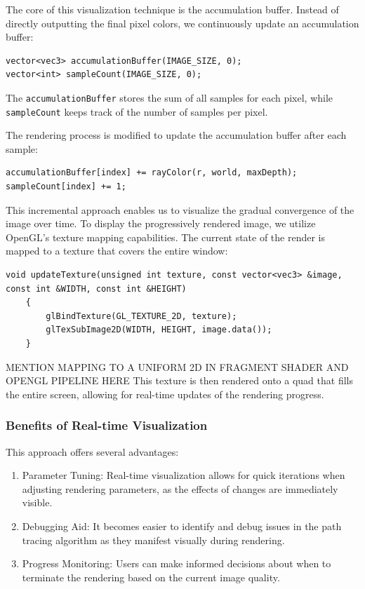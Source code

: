 \documentclass[12pt]{article}
\begin{document}
The core of this visualization technique is the accumulation buffer. Instead of directly outputting the final pixel colors, we continuously update an accumulation buffer:

\begin{verbatim}
vector<vec3> accumulationBuffer(IMAGE_SIZE, 0);
vector<int> sampleCount(IMAGE_SIZE, 0);
\end{verbatim}

The \texttt{accumulationBuffer} stores the sum of all samples for each pixel, while \texttt{sampleCount} keeps track of the number of samples per pixel.

The rendering process is modified to update the accumulation buffer after each sample:

\begin{verbatim}
accumulationBuffer[index] += rayColor(r, world, maxDepth);
sampleCount[index] += 1;
\end{verbatim}

This incremental approach enables us to visualize the gradual convergence of the image over time.
To display the progressively rendered image, we utilize OpenGL's texture mapping capabilities. The current state of the render is mapped to a texture that covers the entire window:

\begin{verbatim}
void updateTexture(unsigned int texture, const vector<vec3> &image,
const int &WIDTH, const int &HEIGHT)
    {
        glBindTexture(GL_TEXTURE_2D, texture);
        glTexSubImage2D(WIDTH, HEIGHT, image.data());
    }
\end{verbatim}

MENTION MAPPING TO A UNIFORM 2D IN FRAGMENT SHADER AND OPENGL PIPELINE HERE
This texture is then rendered onto a quad that fills the entire screen, allowing for real-time updates of the rendering progress.

\subsubsection{Benefits of Real-time Visualization}

This approach offers several advantages:

\begin{enumerate}
    \item Parameter Tuning: Real-time visualization allows for quick iterations when adjusting rendering parameters, as the effects of changes are immediately visible.
    \item Debugging Aid: It becomes easier to identify and debug issues in the path tracing algorithm as they manifest visually during rendering.
    \item Progress Monitoring: Users can make informed decisions about when to terminate the rendering based on the current image quality.
\end{enumerate}
\end{document}
